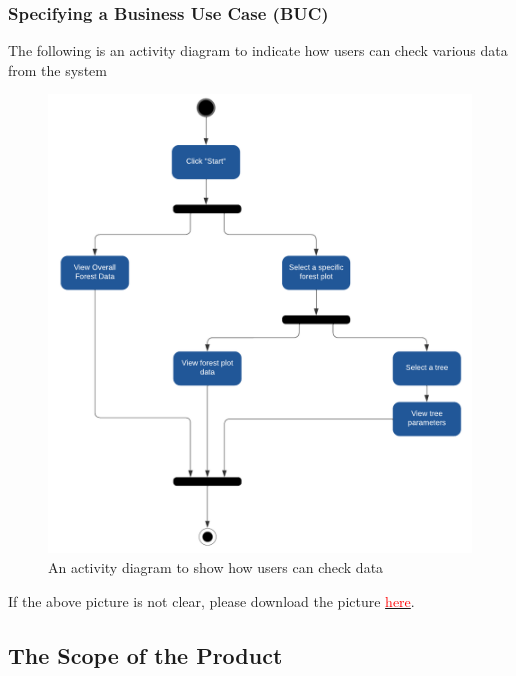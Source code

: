 \documentclass{article}
\begin{document}
\subsubsection{Specifying a Business Use Case (BUC)}
The following is an activity diagram to indicate how users can check various data
from the system\\
\begin{figure}[H]
    \centering
    \includegraphics[scale=0.8]{SRS_Pictures/Activity_Diagram.png}
    \caption{An activity diagram to show how users can check data}
\end{figure}
\noindent If the above picture is not clear, please download the picture \href{https://github.com/wuj187/DigitalTwinCAS/blob/main/docs/SRS/SRS_Pictures/Activity_Diagram.png}{\textcolor{red}{here}}.

\subsection{The Scope of the Product}
\end{document}
